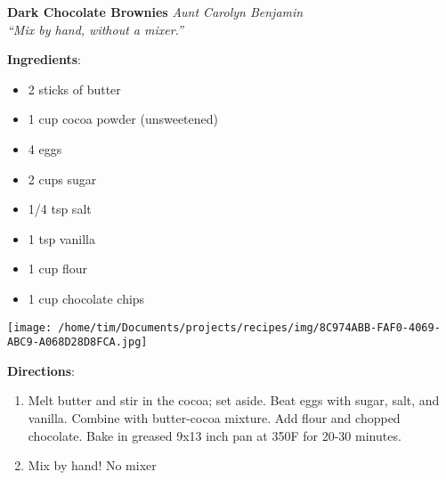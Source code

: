 \documentclass[11pt, twoside, openany]{book}
\begin{document}
\noindent\begin{minipage}[t]{\linewidth}%
{\Large\textbf{Dark Chocolate Brownies}} \label{dark-chocolate-brownies}\hfill\textit{Aunt Carolyn Benjamin}\\
\textit{``Mix by hand, without a mixer.''}\\
\noindent\begin{minipage}[t]{0.78\linewidth}%
\textbf{Ingredients}:\vspace{-3mm}
\begin{multicols}{2}
\begin{itemize}\setlength\itemsep{-1mm}
\item 2 sticks of butter
\item 1 cup cocoa powder (unsweetened)
\item 4 eggs
\item 2 cups sugar
\item 1/4 tsp salt
\item 1 tsp vanilla
\item 1 cup flour
\item 1 cup chocolate chips
\end{itemize}
\end{multicols}
\end{minipage}
\noindent\begin{minipage}[t]{0.18\linewidth}
\centering \strut\vspace*{-\baselineskip}\newline
\texttt{[image: /home/tim/Documents/projects/recipes/img/8C974ABB-FAF0-4069-ABC9-A068D28D8FCA.jpg]}\\
\end{minipage}\vspace{3mm}
\textbf{Directions}:
\vspace{-3mm}\begin{enumerate}\setlength\itemsep{-1mm}
\item Melt butter and stir in the cocoa; set aside. Beat eggs with sugar, salt, and vanilla. Combine with butter-cocoa mixture. Add flour and chopped chocolate. Bake in greased 9x13 inch pan at 350F for 20-30 minutes.
\item Mix by hand! No mixer
\end{enumerate}
\end{minipage}\vspace{8mm}
\end{document}
